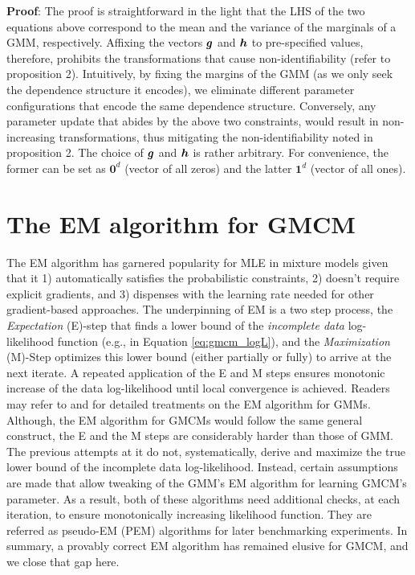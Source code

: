 \documentclass{article}
\begin{document}
\textbf{Proof}: The proof is straightforward in the light that the LHS of the two equations above correspond to the mean and the variance of the marginals of a GMM, respectively. Affixing the vectors $\boldsymbol{g}$ and $\boldsymbol{h}$ to pre-specified values, therefore, prohibits the transformations that cause non-identifiability  (refer to proposition 2). Intuitively, by fixing the margins of the GMM (as we only seek the dependence structure it encodes), we eliminate different parameter configurations that encode the same dependence structure. Conversely, any parameter update that abides by the above two constraints, would result in non-increasing transformations, thus mitigating the non-identifiability noted in proposition 2. The choice of $\boldsymbol{g}$ and $\boldsymbol{h}$ is rather arbitrary. For convenience, the former can be set as $\mathbf{0}^d$ (vector of all zeros) and the latter $\mathbf{1}^d$ (vector of all ones).

\section{The EM algorithm for GMCM}\label{sec:EM}
The EM algorithm has garnered popularity for MLE in mixture models given that it 1) automatically satisfies the probabilistic constraints, 2) doesn't require explicit gradients, and 3) dispenses with the learning rate needed for other gradient-based approaches. The underpinning of EM is a two step process, the \emph{Expectation} (E)-step that finds a lower bound of the \emph{incomplete data} log-likelihood function (e.g., in Equation \eqref{eq:gmcm_logL}), and the \emph{Maximization} (M)-Step optimizes this lower bound (either partially or fully) to arrive at the next iterate. A repeated application of the E and M steps ensures monotonic increase of the data log-likelihood until local convergence is achieved. Readers may refer to \citet{Bilmes98agentle} and \citet{Salakhutdinov2002} for detailed treatments on the EM algorithm for GMMs. Although, the EM algorithm for GMCMs would follow the same general construct, the E and the M steps are considerably harder than those of GMM. The previous attempts at it \citep{Tewari2011, Bhattacharya2014} do not, systematically, derive and maximize the true lower bound of the incomplete data log-likelihood. Instead, certain assumptions are made that allow tweaking of the GMM's EM algorithm for learning GMCM's parameter. As a result, both of these algorithms need additional checks, at each iteration, to ensure monotonically increasing likelihood function. They are referred as pseudo-EM (PEM) algorithms for later benchmarking experiments. In summary, a provably correct EM algorithm has remained elusive for GMCM, and we close that gap here.
\end{document}
